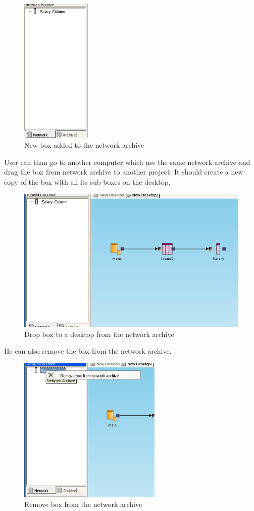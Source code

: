 \documentclass[a4paper,12pt]{book}
\begin{document}
\begin{figure}
	\includegraphics[height=7cm]{network_archive_box_added}
	\caption{New box added to the network archive}
\end{figure}
User can than go to another computer which use the same network archive and drag the box from network archive to another project. It should create a new copy of the box with all its sub-boxes on the desktop.
\begin{figure}
	\includegraphics[width=13.72cm]{network_archive_drop_to_desktop}
	\caption{Drop box to a desktop from the network archive}
\end{figure}
He can also remove the box from the network archive.
\begin{figure}
	\includegraphics[height=7cm]{network_archive_remove_box}
	\caption{Remove box from the network archive}
\end{figure}
\end{document}
